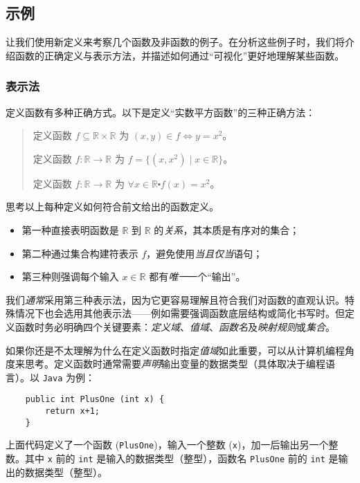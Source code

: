 
\subsection{示例}

让我们使用新定义来考察几个函数及非函数的例子。在分析这些例子时，我们将介绍函数的正确定义与表示方法，并描述如何通过``可视化''更好地理解某些函数。

\subsubsection*{表示法}

定义函数有多种正确方式。以下是定义``实数平方函数''的三种正确方法：
\begin{quotation}
    定义函数 $f \subseteq \mathbb{R} \times \mathbb{R}$ 为 $(x, y) \in f \iff y = x^2$。

    定义函数 $f : \mathbb{R} \to \mathbb{R}$ 为 $f=\big\{(x,x^2) \mid x \in \mathbb{R}\big\}$。

    定义函数 $f : \mathbb{R} \to \mathbb{R}$ 为 $\forall x \in \mathbb{R} \centerdot f(x) = x^2$。
\end{quotation}

思考以上每种定义如何符合前文给出的函数定义。
\begin{itemize}
    \item 第一种直接表明函数是 $\mathbb{R}$ 到 $\mathbb{R}$ 的\emph{关系}，其本质是有序对的集合；
    \item 第二种通过集合构建符表示 $f$，避免使用\emph{当且仅当}语句；
    \item 第三种则强调每个输入 $x \in \mathbb{R}$ 都有\emph{唯一}一个``输出''。
\end{itemize}

我们\emph{通常}采用第三种表示法，因为它更容易理解且符合我们对函数的直观认识。特殊情况下也会选用其他表示法——例如需要强调函数底层结构或简化书写时。但定义函数时务必明确四个关键要素：\emph{定义域}、\emph{值域}、\emph{函数名}及\emph{映射规则}或\emph{集合}。

如果你还是不太理解为什么在定义函数时指定\emph{值域}如此重要，可以从计算机编程角度来思考。定义函数时通常需要\emph{声明}输出变量的数据类型（具体取决于编程语言）。以 \verb|Java| 为例：
\begin{verbatim}
    public int PlusOne (int x) {
        return x+1;
    }
\end{verbatim}
上面代码定义了一个函数 (\verb|PlusOne|)，输入一个整数 (\verb|x|)，加一后输出另一个整数。其中 \verb|x| 前的 \verb|int| 是输入的数据类型（整型），函数名 \verb|PlusOne| 前的 \verb|int| 是输出的数据类型（整型）。\\

